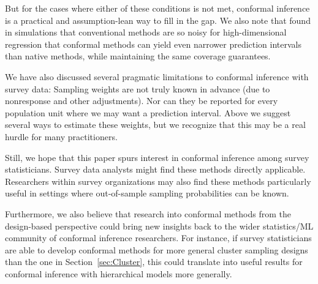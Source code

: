 \documentclass[10.5pt, letterpaper]{article}
\numberwithin{table}{section}
\numberwithin{figure}{section}
\numberwithin{equation}{section}
\begin{document}
But for the cases where either of these conditions is not met, conformal inference is a practical and assumption-lean way to fill in the gap. We also note that \cite{lei2018distribution} found in simulations that conventional methods are so noisy for high-dimensional regression that conformal methods can yield even narrower prediction intervals than native methods, while maintaining the same coverage guarantees.

We have also discussed several pragmatic limitations to conformal inference with survey data: Sampling weights are not truly known in advance (due to nonresponse and other adjustments). Nor can they be reported for every population unit where we may want a prediction interval.
Above we suggest several ways to estimate these weights, but we recognize that this may be a real hurdle for many practitioners.

Still, we hope that this paper spurs interest in conformal inference among survey statisticians. Survey data analysts might find these methods directly applicable. Researchers within survey organizations may also find these methods particularly useful in settings where out-of-sample sampling probabilities can be known.

Furthermore, we also believe that research into conformal methods from the design-based perspective could bring new insights back to the wider statistics/ML community of conformal inference researchers.
For instance, if survey statisticians are able to develop conformal methods for more general cluster sampling designs than the one in Section~\ref{sec:Cluster}, this could translate into useful results for conformal inference with hierarchical models more generally.
\end{document}
